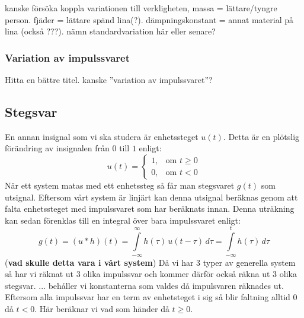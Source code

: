 kanske försöka koppla variationen till verkligheten, massa = lättare/tyngre person. fjäder = lättare spänd lina(?). dämpningskonstant = annat material på lina (också ???).
nämn standardvariation här eller senare?

\subsubsection{Variation av impulssvaret}
Hitta en bättre titel. kanske ''variation av impulssvaret''?




\newpage
\subsection{Stegsvar}
En annan insignal som vi ska studera är enhetssteget $u(t)$. Detta är en plötslig förändring av insignalen från $0$ till $1$ enligt:
$$u(t)=\begin{cases} 1, & \text{om } t \ge 0 \\ 0, & \text{om } t < 0\end{cases}$$
När ett system matas med ett enhetssteg så får man stegsvaret $g(t)$ som utsignal. Eftersom vårt system är linjärt kan denna utsignal beräknas genom att falta enhetssteget med impulssvaret som har beräknats innan. Denna uträkning kan sedan förenklas till en integral över bara impulssvaret enligt:
$$g(t)=(u*h)(t)=\int\limits_{-\infty}^{\infty}h(\tau)\,u(t-\tau)\,d\tau=\int\limits_{-\infty}^{t}h(\tau)\,d\tau$$
(\textbf{vad skulle detta vara i vårt system})
Då vi har 3 typer av generella system så har vi räknat ut 3 olika impulssvar och kommer därför också räkna ut 3 olika stegsvar. ... behåller vi konstanterna som valdes då impulsvaren räknades ut. Eftersom alla impulssvar har en term av enhetsteget i sig så blir faltning alltid $0$ då $t < 0$. Här beräknar vi vad som händer då $t \ge 0$.

